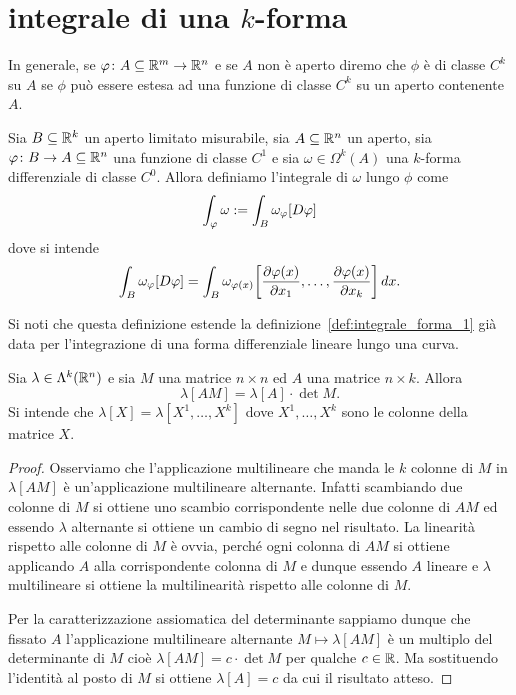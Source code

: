 \section{integrale di una $k$-forma}

In generale, se $\varphi\colon A \subseteq {\mathbb R}^m\to {\mathbb R}^n$ e se $A$ non è aperto 
diremo che $\phi$ è di classe $C^k$ su $A$ se $\phi$ può essere estesa ad una funzione 
di classe $C^k$ su un aperto contenente $A$.

\begin{definition}
Sia $B\subseteq {\mathbb R}^k$ un aperto limitato misurabile, sia $A\subseteq {\mathbb R}^n$ un aperto,
sia $\varphi\colon B\to A\subseteq {\mathbb R}^n$ una funzione di classe $C^1$
e sia $\omega \in \Omega^k(A)$ una $k$-forma differenziale di classe $C^0$.
Allora definiamo l'integrale di $\omega$ lungo $\phi$ come
\[ 
  \int_\varphi \omega 
  := \int_B \omega_\varphi[D\varphi]
\]
dove si intende
\[
  \int_B \omega_\varphi[D\varphi]
  = \int_B \omega_{\varphi(x)}{\left[ \frac{\partial \varphi(x)}{\partial x_1}, \dots, \frac{\partial \varphi(x)}{\partial x_k} \right]}
  \, dx.
\]

Si noti che questa definizione estende la definizione~\ref{def:integrale_forma_1} 
già data per l'integrazione di una forma differenziale lineare lungo una curva.
\end{definition}

\begin{lemma}
  \label{lm:549867}
  Sia $\lambda\in \Lambda^k({\mathbb R}^n)$ e sia $M$ una matrice $n\times n$
  ed $A$ una matrice $n\times k$.
  Allora 
  \[
     \lambda[AM] = \lambda[A] \cdot \det M.
  \]
  Si intende che $\lambda[X] = \lambda[X^1,\dots, X^k]$ dove $X^1,\dots,X^k$ sono 
  le colonne della matrice $X$.
\end{lemma}
\begin{proof}
Osserviamo che l'applicazione multilineare  
che manda le $k$ colonne di $M$ in $\lambda[AM]$ è un'applicazione multilineare alternante.
Infatti scambiando due colonne di $M$ si ottiene uno scambio corrispondente nelle due colonne di $AM$ 
ed essendo $\lambda$ alternante si ottiene un cambio di segno nel risultato.
La linearità rispetto alle colonne di $M$ è ovvia, perché ogni colonna di $AM$ si ottiene 
applicando $A$ alla corrispondente colonna di $M$ e dunque essendo $A$ lineare e $\lambda$ multilineare 
si ottiene la multilinearità rispetto alle colonne di $M$.

Per la caratterizzazione assiomatica del determinante sappiamo dunque 
che fissato $A$ l'applicazione multilineare alternante $M\mapsto \lambda[AM]$ è un multiplo del determinante
di $M$ cioè $\lambda[AM] = c \cdot \det M$ per qualche $c\in {\mathbb R}$. 
Ma sostituendo l'identità al posto di $M$ si ottiene $\lambda[A]=c$ 
da cui il risultato atteso.
\end{proof}

